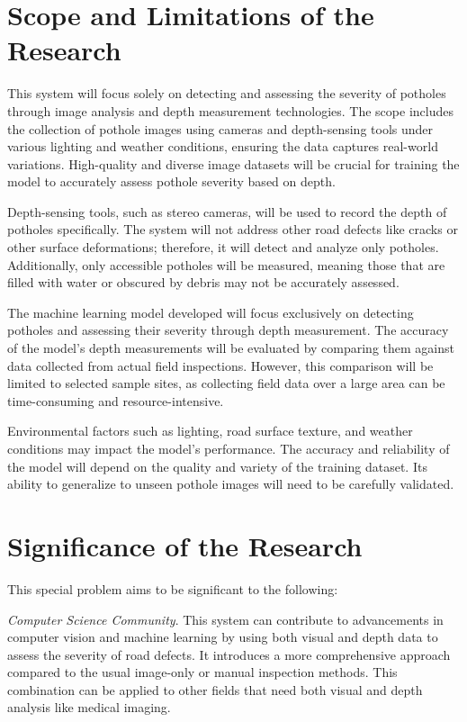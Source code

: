 \section{Scope and Limitations of the Research}
\label{sec:scopelimitations}



This system will focus solely on detecting and assessing the severity of potholes through image analysis and depth measurement technologies. The scope includes the collection of pothole images using cameras and depth-sensing tools under various lighting and weather conditions, ensuring the data captures real-world variations. High-quality and diverse image datasets will be crucial for training the model to accurately assess pothole severity based on depth.

Depth-sensing tools, such as stereo cameras, will be used to record the depth of potholes specifically. The system will not address other road defects like cracks or other surface deformations; therefore, it will detect and analyze only potholes. Additionally, only accessible potholes will be measured, meaning those that are filled with water or obscured by debris may not be accurately assessed.

The machine learning model developed will focus exclusively on detecting potholes and assessing their severity through depth measurement. The accuracy of the model’s depth measurements will be evaluated by comparing them against data collected from actual field inspections. However, this comparison will be limited to selected sample sites, as collecting field data over a large area can be time-consuming and resource-intensive.

Environmental factors such as lighting, road surface texture, and weather conditions may impact the model's performance. The accuracy and reliability of the model will depend on the quality and variety of the training dataset. Its ability to generalize to unseen pothole images will need to be carefully validated.


\section{Significance of the Research}
\label{sec:significance}

This special problem aims to be significant to the following:


\textit{Computer Science Community}. This system can contribute to advancements in computer vision and machine learning by using both visual and depth data to assess the severity of road defects. It introduces a more comprehensive approach compared to the usual image-only or manual inspection methods. This combination can be applied to other fields that need both visual and depth analysis like medical imaging. 


